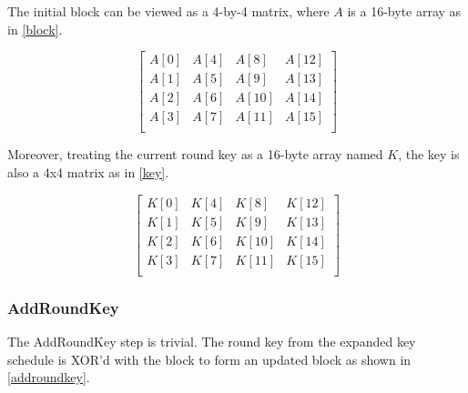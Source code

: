 \documentclass[a4paper,10pt,conference]{IEEEtran}
\begin{document}
The initial block can be viewed as a 4-by-4 matrix, where $A$ is a 16-byte array as in \ref{block}.

\begin{equation}
 \begin{bmatrix}
  A[0] & A[4] & A[8] & A[12] \\
  A[1] & A[5] & A[9] & A[13] \\
  A[2] & A[6] & A[10] & A[14] \\
  A[3] & A[7] & A[11] & A[15] \\
 \end{bmatrix}
\label{block}
\end{equation}

Moreover, treating the current round key as a 16-byte array named $K$, the key is also a 4x4 matrix as in \ref{key}.

\begin{equation}
 \begin{bmatrix}
  K[0] & K[4] & K[8] & K[12] \\
  K[1] & K[5] & K[9] & K[13] \\
  K[2] & K[6] & K[10] & K[14] \\
  K[3] & K[7] & K[11] & K[15] \\
 \end{bmatrix}
\label{key}
\end{equation}

\subsubsection{AddRoundKey}

The AddRoundKey step is trivial.  The round key from the expanded key schedule is XOR'd with the block to form an updated block as shown in \ref{addroundkey}.
\end{document}
